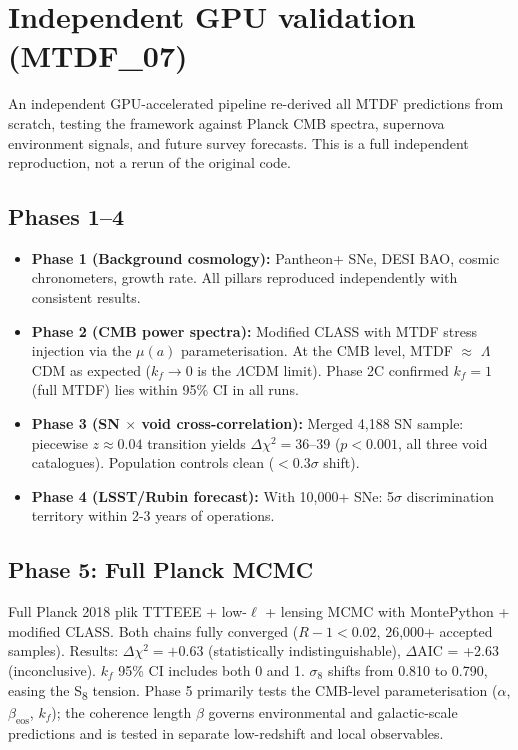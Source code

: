 \documentclass[11pt,a4paper]{article}
\begin{document}
\section{Independent GPU validation (MTDF\_\allowbreak{}07)}
\label{sec:sec11}
An independent GPU-accelerated pipeline re-derived all MTDF predictions from scratch, testing the framework against Planck CMB spectra, supernova environment signals, and future survey forecasts. This is a full independent reproduction, not a rerun of the original code.

\subsection{Phases 1--4}
\begin{itemize}
  \item \textbf{Phase 1 (Background cosmology):} Pantheon+ SNe, DESI BAO, cosmic chronometers, growth rate. All pillars reproduced independently with consistent results.
  \item \textbf{Phase 2 (CMB power spectra):} Modified CLASS with MTDF stress injection via the $\mu(a)$ parameterisation. At the CMB level, MTDF $\approx$ $\Lambda$CDM as expected ($k_f \to 0$ is the $\Lambda$CDM limit). Phase 2C confirmed $k_f = 1$ (full MTDF) lies within 95\% CI in all runs.
  \item \textbf{Phase 3 (SN $\times$ void cross-correlation):} Merged 4,188 SN sample: piecewise $z \approx 0.04$ transition yields $\Delta\chi^2 = 36$--$39$ ($p < 0.001$, all three void catalogues). Population controls clean ($< 0.3\sigma$ shift).
  \item \textbf{Phase 4 (LSST/\allowbreak{}Rubin forecast):} With 10,000+ SNe: 5$\sigma$ discrimination territory within 2-3 years of operations.
\end{itemize}

\subsection{Phase 5: Full Planck MCMC}
Full Planck 2018 plik TTTEEE + low-$\ell$ + lensing MCMC with MontePython + modified CLASS. Both chains fully converged ($R-1 < 0.02$, 26,000+ accepted samples). Results: $\Delta\chi^2 = +0.63$ (statistically indistinguishable), $\Delta$AIC = +2.63 (inconclusive). $k_f$ 95\% CI includes both 0 and 1. $\sigma_8$ shifts from 0.810 to 0.790, easing the S\textsubscript{8} tension. Phase 5 primarily tests the CMB-level parameterisation ($\alpha$, $\beta_\text{eos}$, $k_f$); the coherence length $\beta$ governs environmental and galactic-scale predictions and is tested in separate low-redshift and local observables.
\end{document}
